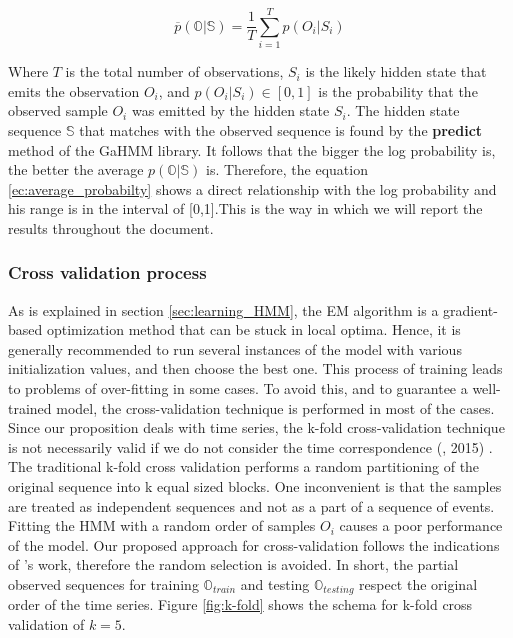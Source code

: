 \begin{equation}
\overline{p}(\mathbb{O}|\mathbb{S}) = \dfrac{1}{T} \sum_{i=1}^{T} p(O_i | S_i)
\label{ec:average_probabilty}
\end{equation}

Where $T$ is the total number of observations, $S_i$ is the likely hidden state that emits the observation $O_i$, and $ p(O_i | S_i) \in [0,1]$ is the probability that the observed sample $O_i$ was emitted by the hidden state $S_i$. The hidden state sequence $\mathbb{S}$ that matches with the observed sequence is found by the \textbf{predict} method \cite{gahmm_manual} of the GaHMM library. It follows that the bigger the log probability is, the better the average $p(\mathbb{O}|\mathbb{S})$ is. Therefore, the equation \ref{ec:average_probabilty} shows a direct relationship with the log probability and his range is in the interval of [0,1].This is the way in which we will report
the results throughout the document.

    
\subsubsection{Cross validation process}
\label{sec:cross}

As is explained in section \ref{sec:learning_HMM}, the EM algorithm is a gradient-based optimization method that can be stuck in local optima. Hence, it is generally recommended to run several instances of the model with various initialization values, and then choose the best one. This process of training leads to problems of over-fitting in some cases. To avoid this, and to guarantee a well-trained model, the cross-validation technique is performed in most of the cases. Since our proposition deals with time series, the k-fold cross-validation technique is
not necessarily valid if we do not consider the time correspondence (\citeauthor{bergmeir2015note}, 2015) \cite{bergmeir2015note}. The traditional k-fold cross validation performs a random partitioning of the original sequence into k equal sized blocks. One inconvenient is that the samples are treated as independent sequences and not as a part of a sequence of events. Fitting the HMM with a random order of samples $O_i$ causes a poor performance of the model. Our proposed approach for cross-validation follows the indications of \citeauthor{bergmeir2015note}'s work, therefore the random selection is avoided. In short, the partial observed sequences for training $\mathbb{O}_{train}$ and testing $\mathbb{O}_{testing}$ respect the original order of the time series. Figure \ref{fig:k-fold} shows the schema for k-fold cross validation of $k=5$. 


